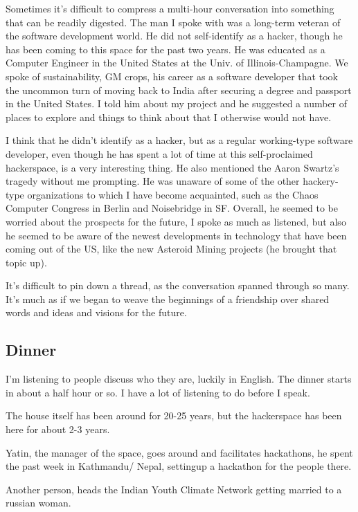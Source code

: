 \documentclass[11pt]{amsart}
\begin{document}
Sometimes it's difficult to compress a multi-hour conversation into something that can be readily digested. The man I spoke with was a long-term veteran of the software development world. He did not self-identify as a hacker, though he has been coming to this space for the past two years. He was educated as a Computer Engineer in the United States at the Univ. of Illinois-Champagne. We spoke of sustainability, GM crops, his career as a software developer that took the uncommon turn of moving back to India after securing a degree and passport in the United States. I told him about my project and he suggested a number of places to explore and things to think about that I otherwise would not have.

I think that he didn't identify as a hacker, but as a regular working-type software developer, even though he has spent a lot of time at this self-proclaimed hackerspace, is a very interesting thing. He also mentioned the Aaron Swartz's tragedy without me prompting. He was unaware of some of the other hackery-type organizations to which I have become acquainted, such as the Chaos Computer Congress in Berlin and Noisebridge in SF. Overall, he seemed to be worried about the prospects for the future, I spoke as much as listened, but also he seemed to be aware of the newest developments in technology that have been coming out of the US, like the new Asteroid Mining projects (he brought that topic up). 

It's difficult to pin down a thread, as the conversation spanned through so many. It's much as if we began to weave the beginnings of a friendship over shared words and ideas and visions for the future.

\subsection{Dinner}

I'm listening to people discuss who they are, luckily in English.  The dinner starts in about a half hour or so.  I have a lot of listening to do before I speak.

The house itself has been around for 20-25 years, but the hackerspace has been here for about 2-3 years.

Yatin, the manager of the space, goes around and facilitates hackathons, he spent the past week in Kathmandu/ Nepal, settingup a hackathon for the people there.

Another person, heads the Indian Youth Climate Network getting married to a russian woman.
\end{document}
